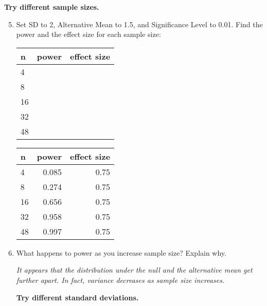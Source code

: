 \begin{center}
  {\bf Try different sample sizes.}
\end{center}
\begin{enumerate}
  \setcounter{enumi}{4}
  \item  Set SD to 2, Alternative Mean to 1.5, and
    Significance Level to 0.01. Find the power and the effect size for
    each sample size:\\ 
\begin{students}
  \begin{tabular}{ |l|r|r|}\hline
    n & power& effect size\\ \hline
    {\large 4} &&\\ \hline
    {\large 8} &&\\ \hline
    {\large 16} &&\\ \hline
    {\large 32} &&\\ \hline
    {\large 48} &&\\ \hline
  \end{tabular}
\end{students}

\begin{key}
  \begin{tabular}{ |l|r|r|}\hline
    n & power& effect size\\ \hline
     4 &0.085& 0.75\\ \hline
     8 &0.274& 0.75\\ \hline
     16 &0.656& 0.75\\ \hline
     32 &0.958 &0.75\\ \hline
     48 &0.997 &0.75\\ \hline
  \end{tabular}
\end{key}
\item      What happens to power as you increase sample size? Explain why.
\begin{students}
\vspace{2cm} %
\end{students}

\begin{key}
  {\it It appears that the distribution under the null and the
    alternative mean get further apart.  In fact, variance decreases
    as sample size increases. }
\end{key}

\begin{center}
  {\bf Try different standard deviations.}
\end{center}


\end{enumerate}

